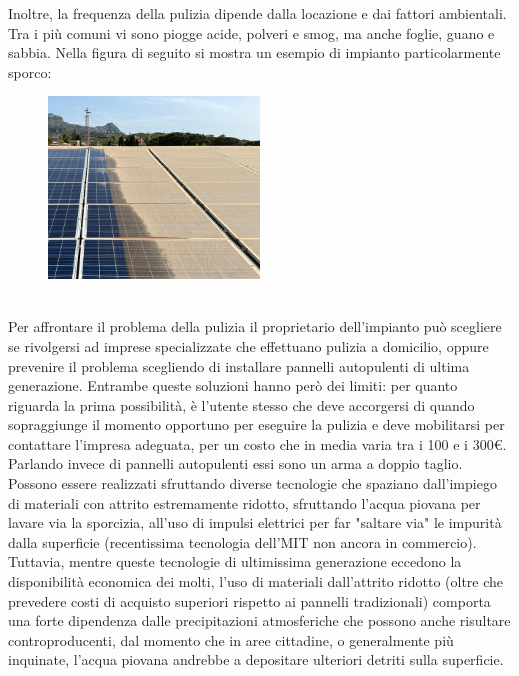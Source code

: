 \documentclass[a4paper, 12pt]{article}
\begin{document}
	Inoltre, la frequenza della pulizia dipende dalla locazione e dai fattori ambientali. Tra i più comuni vi sono piogge acide, polveri e smog, ma anche foglie, guano e sabbia. %
	Nella figura di seguito si mostra un esempio di impianto particolarmente sporco: %
	\begin{figure}[h]
		\centering\includegraphics[width=0.5\textwidth]{Images/pannelli_sporchi2.jpg}
	\end{figure}\\
	Per affrontare il problema della pulizia il proprietario dell'impianto può scegliere se rivolgersi ad imprese specializzate che effettuano pulizia a domicilio, oppure prevenire il problema scegliendo di installare pannelli autopulenti di ultima generazione. %
	Entrambe queste soluzioni hanno però dei limiti: per quanto riguarda la prima possibilità, è l'utente stesso che deve accorgersi di quando sopraggiunge il momento opportuno per eseguire la pulizia e deve mobilitarsi per contattare l'impresa adeguata, per un costo che in media varia tra i 100 e i 300\euro.\\
	Parlando invece di pannelli autopulenti essi sono un arma a doppio taglio.\\
	Possono essere realizzati sfruttando diverse tecnologie che spaziano dall'impiego di materiali con attrito estremamente ridotto, sfruttando l'acqua piovana per lavare via la sporcizia, all'uso di impulsi elettrici per far "saltare via" le impurità dalla superficie (recentissima tecnologia dell'MIT non ancora in commercio). Tuttavia, mentre queste tecnologie di ultimissima generazione eccedono la disponibilità economica dei molti, l'uso di materiali dall'attrito ridotto (oltre che prevedere costi di acquisto superiori rispetto ai pannelli tradizionali) comporta una forte dipendenza dalle precipitazioni atmosferiche che possono anche risultare controproducenti, dal momento che in aree cittadine, o generalmente più inquinate, l'acqua piovana andrebbe a depositare ulteriori detriti sulla superficie.\\
\end{document}
